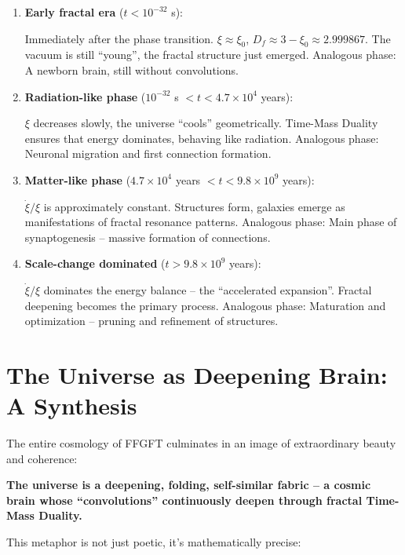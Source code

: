 \begin{enumerate}[leftmargin=*]
\item \textbf{Early fractal era} ($t < 10^{-32}$ s): 

Immediately after the phase transition. $\xi \approx \xi_0$, $D_f \approx 3 - \xi_0 \approx 2.999867$. The vacuum is still ``young'', the fractal structure just emerged. Analogous phase: A newborn brain, still without convolutions.

\item \textbf{Radiation-like phase} ($10^{-32}$ s $ < t < 4.7 \times 10^4$ years):

$\xi$ decreases slowly, the universe ``cools'' geometrically. Time-Mass Duality ensures that energy dominates, behaving like radiation. Analogous phase: Neuronal migration and first connection formation.

\item \textbf{Matter-like phase} ($4.7 \times 10^4$ years $ < t < 9.8 \times 10^9$ years):

$\dot{\xi}/\xi$ is approximately constant. Structures form, galaxies emerge as manifestations of fractal resonance patterns. Analogous phase: Main phase of synaptogenesis -- massive formation of connections.

\item \textbf{Scale-change dominated} ($t > 9.8 \times 10^9$ years):

$\dot{\xi}/\xi$ dominates the energy balance -- the ``accelerated expansion''. Fractal deepening becomes the primary process. Analogous phase: Maturation and optimization -- pruning and refinement of structures.
\end{enumerate}

\section{The Universe as Deepening Brain: A Synthesis}

The entire cosmology of FFGFT culminates in an image of extraordinary beauty and coherence:

\textbf{The universe is a deepening, folding, self-similar fabric -- a cosmic brain whose ``convolutions'' continuously deepen through fractal Time-Mass Duality.}

This metaphor is not just poetic, it's mathematically precise:

